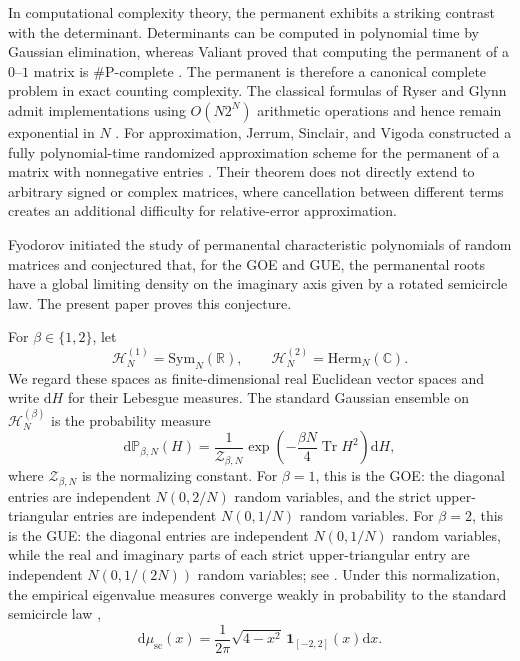 \documentclass[11pt,reqno]{amsart}
\numberwithin{equation}{section}
\theoremstyle{definition}
\theoremstyle{remark}
\DeclareMathOperator{\Tr}{Tr}
\newcommand{\Pp}{\mathbb P}
\newcommand{\R}{\mathbb R}
\newcommand{\C}{\mathbb C}
\newcommand{\1}{\mathbf 1}
\newcommand{\dd}{\mathrm d}
\newcommand{\Sym}{\mathrm{Sym}}
\newcommand{\Herm}{\mathrm{Herm}}
\begin{document}
In computational complexity theory, the permanent exhibits a striking
contrast with the determinant.  Determinants can be computed in polynomial
time by Gaussian elimination, whereas Valiant proved that computing the
permanent of a \(0\)--\(1\) matrix is \(\#\mathrm P\)-complete
\cite{Valiant1979}.  The permanent is therefore a canonical complete problem
in exact counting complexity.  The classical formulas of Ryser and Glynn
admit implementations using \(O(N2^N)\) arithmetic operations and hence remain
exponential in \(N\) \cite{Ryser1963,Glynn2010}.  For approximation, Jerrum,
Sinclair, and Vigoda constructed a fully polynomial-time randomized
approximation scheme for the permanent of a matrix with nonnegative entries
\cite{JerrumSinclairVigoda2004}.  Their theorem does not directly extend to
arbitrary signed or complex matrices, where cancellation between different
terms creates an additional difficulty for relative-error approximation.

Fyodorov \cite{Fyodorov2006} initiated the study of permanental
characteristic polynomials of random matrices and conjectured that, for the
GOE and GUE, the permanental roots have a global limiting density on the
imaginary axis given by a rotated semicircle law.  The present paper proves
this conjecture.

For \(\beta\in\{1,2\}\), let
\[
  \mathcal H_N^{(1)}=\Sym_N(\R),
  \qquad
  \mathcal H_N^{(2)}=\Herm_N(\C).
\]
We regard these spaces as finite-dimensional real Euclidean vector spaces and
write \(\dd H\) for their Lebesgue measures.  The standard Gaussian ensemble
on \(\mathcal H_N^{(\beta)}\) is the probability measure
\[
  \dd\Pp_{\beta,N}(H)
  =
  \frac{1}{\mathcal Z_{\beta,N}}
  \exp\!\left(-\frac{\beta N}{4}\Tr H^2\right)\dd H,
\]
where \(\mathcal Z_{\beta,N}\) is the normalizing constant.  For \(\beta=1\),
this is the GOE: the diagonal entries are independent \(N(0,2/N)\) random
variables, and the strict upper-triangular entries are independent
\(N(0,1/N)\) random variables.  For \(\beta=2\), this is the GUE: the
diagonal entries are independent \(N(0,1/N)\) random variables, while the
real and imaginary parts of each strict upper-triangular entry are independent
\(N(0,1/(2N))\) random variables; see
\cite[Sections~2.1, 2.2 and~2.5]{AndersonGuionnetZeitouni2010}.
Under this normalization, the empirical eigenvalue measures converge weakly
in probability to the
standard semicircle law \cite[Theorem~2.1.1]{AndersonGuionnetZeitouni2010},
\[
  \dd\mu_{\mathrm{sc}}(x)
  =
  \frac{1}{2\pi}\sqrt{4-x^2}\,
  \1_{[-2,2]}(x)\dd x.
\]
\end{document}
